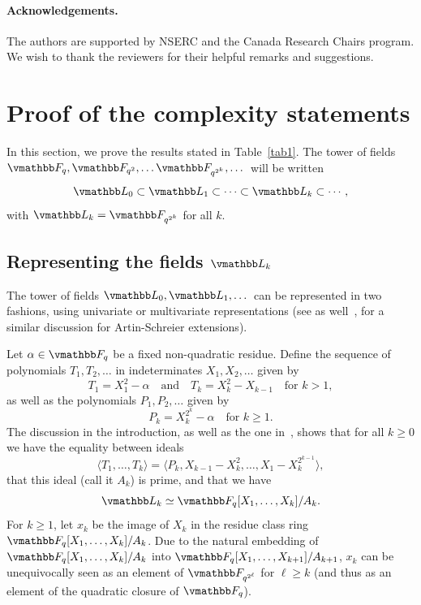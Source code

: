 \paragraph{Acknowledgements.} The authors are supported by NSERC and
the Canada Research Chairs program. We wish to thank the reviewers for
their helpful remarks and suggestions.


\section{Proof of the complexity statements}\label{sec:proof}

In this section, we prove the results stated in Table~\ref{tab1}.
The tower of fields $\F_q,\F_{q^2},\dots\F_{q^{2^k}},\dots$ will be
written
$$\L_0 \subset \L_1 \subset \cdots \subset \L_k \subset \cdots,$$ with
$\L_k = \F_{q^{2^k}}$ for all $k$.


\subsection{Representing the fields $\L_k$}

The tower of fields $\L_0,\L_1,\dots$ can be represented in two
fashions, using univariate or multivariate representations (see as
well~\cite{DeSc12}, for a similar discussion for Artin-Schreier
extensions).

Let $\alpha\in\F_q$ be a fixed non-quadratic residue.  Define the
sequence of polynomials $T_1,T_2,\dots$ in indeterminates
$X_1,X_2,\dots$ given by
$$T_1 = X_1^2-\alpha \quad\text{and}\quad T_k = X_k^2-X_{k-1}
\quad\text{for $k > 1$},$$ as well as the polynomials $P_1,P_2,\dots$ given by
$$P_k = X_k^{2^k} - \alpha\quad\text{for $k \ge 1$}.$$The discussion
in the introduction, as well as the one in~\cite{Lang02}, shows that for 
all $k \ge 0$ we have the equality between ideals
\begin{equation}\label{eq:TP}
\langle T_1,\dots,T_k \rangle = \langle P_k, X_{k-1}-X_k^2, \dots,
X_1-X_k^{2^{k-1}} \rangle,
\end{equation}
that this ideal (call it $A_k$) is prime, and that we have
$$\L_k \simeq \F_q[X_1,\dots,X_k]/ A_k.$$ 
For $k \ge 1$, let $x_k$ be the image of $X_k$ in the residue class
ring $\F_q[X_1,\dots,X_k]/A_k$.  Due to the natural embedding of
$\F_q[X_1,\dots,X_k]/ A_k$ into $\F_q[X_1,\dots,X_{k+1}]/ A_{k+1}$,
$x_k$ can be unequivocally seen as an element of $\F_{q^{2^\ell}}$ for $\ell
\ge k$ (and thus as an element of the quadratic closure of $\F_q$).

